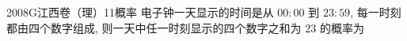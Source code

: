 
\begin{problem}{2008}{G}{江西卷（理）}{11}{概率}
电子钟一天显示的时间是从 $ 00:00 $ 到 $ 23:59 $, 每一时刻都由四个数字组成, 则一天中任一时刻显示的四个数字之和为 $ 23 $ 的概率为
\begin{choices}
\end{choices}
\end{problem}

\begin{answer}

\end{answer}

\begin{solutions}

\end{solutions}